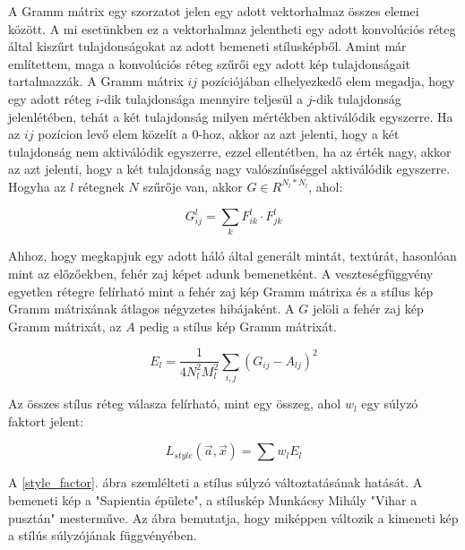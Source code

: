 \documentclass[12pt, a4paper, oneside]{book}
\theoremstyle{tetel}
\begin{document}
A Gramm mátrix egy szorzatot jelen egy adott vektorhalmaz összes elemei között. A mi esetünkben ez a vektorhalmaz jelentheti egy adott konvolúciós réteg által kiszűrt tulajdonságokat az adott bemeneti stílusképből. Amint már említettem, maga a konvolúciós réteg szűrői egy adott kép tulajdonságait tartalmazzák. A Gramm mátrix \(ij\) pozíciójában elhelyezkedő elem megadja, hogy egy adott réteg \(i\)-dik tulajdonsága mennyire teljesül a \(j\)-dik tulajdonság jelenlétében, tehát a két tulajdonság milyen mértékben aktiválódik egyszerre. Ha az \(ij\) pozícion levő elem közelít a \(0\)-hoz, akkor az azt jelenti, hogy a két tulajdonság nem aktiválódik egyszerre, ezzel ellentétben, ha az érték nagy, akkor az azt jelenti, hogy a két tulajdonság nagy valószínűséggel aktiválódik egyszerre.
\newline
\indent
Hogyha az \(l\) rétegnek \(N\) szűrője van, akkor \(G \in R^{N_l*N_l}\), ahol:

\begin{equation}
G^l_{ij} = \sum_{k} F^l_{ik} \cdot F^l_{jk}
\end{equation}

Ahhoz, hogy megkapjuk egy adott háló által generált mintát, textúrát, hasonlóan mint az előzőekben, fehér zaj képet adunk bemenetként. A veszteségfüggvény egyetlen rétegre felírható mint a fehér zaj kép Gramm mátrixa és a stílus kép Gramm mátrixának átlagos négyzetes hibájaként. A \(G\) jelöli a fehér zaj kép Gramm mátrixát, az \(A\) pedig a stílus kép Gramm mátrixát.

\begin{equation}
E_l = \frac{1}{4N^2_l M^2_l} \sum_{i,j} (G_{ij} - A_{lj})^2
\end{equation}

Az összes stílus réteg válasza felírható, mint egy összeg, ahol \(w_l\) egy súlyzó faktort jelent:

\begin{equation}
L_{style}(\vec{a}, \vec{x}) = \sum w_lE_l
\end{equation}

A \ref{style_factor}. ábra szemlélteti a stílus súlyzó változtatásának hatását. A bemeneti kép a "Sapientia épülete", a stíluskép Munkácsy Mihály "Vihar a pusztán" mesterműve. Az ábra bemutatja, hogy miképpen változik a kimeneti kép a stílús súlyzójának függvényében.
\end{document}
